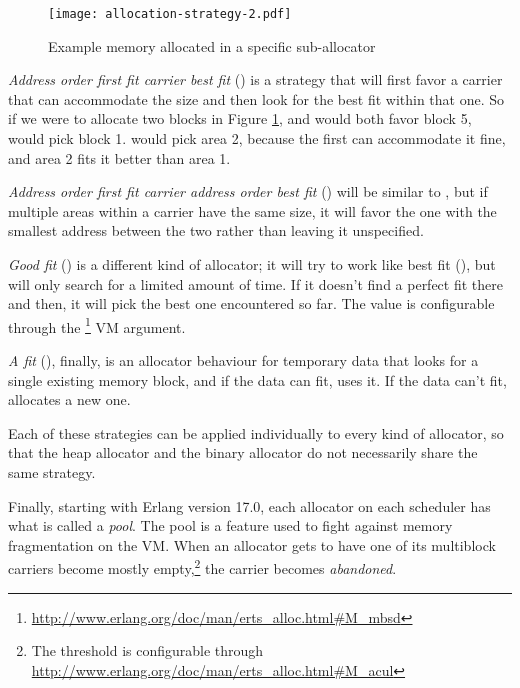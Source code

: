 \begin{figure}
  \texttt{[image: allocation-strategy-2.pdf]}%
  \centering%
  \caption{Example memory allocated in a specific sub-allocator}%
   \label{fig:allocation-strategy-2}
\end{figure}
\FloatBarrier

\emph{Address order first fit carrier best fit} () is a strategy that will first favor a carrier that can accommodate the size and then look for the best fit within that one. So if we were to allocate two blocks in Figure \ref{fig:allocation-strategy-2},  and  would both favor block 5,  would pick block 1.  would pick area 2, because the first  can accommodate it fine, and area 2 fits it better than area 1.

\emph{Address order first fit carrier address order best fit} () will be similar to , but if multiple areas within a carrier have the same size, it will favor the one with the smallest address between the two rather than leaving it unspecified.

\emph{Good fit} () is a different kind of allocator; it will try to work like best fit (), but will only search for a limited amount of time. If it doesn't find a perfect fit there and then, it will pick the best one encountered so far. The value is configurable through the \footnote{\href{http://www.erlang.org/doc/man/erts\_alloc.html\#M\_mbsd}{http://www.erlang.org/doc/man/erts\_alloc.html\#M\_mbsd}} VM argument.

\emph{A fit} (), finally, is an allocator behaviour for temporary data that looks for a single existing memory block, and if the data can fit,  uses it. If the data can't fit,  allocates a new one.

Each of these strategies can be applied individually to every kind of allocator, so that the heap allocator and the binary allocator do not necessarily share the same strategy.

Finally, starting with Erlang version 17.0, each  allocator on each scheduler has what is called a \emph{ pool}. The  pool is a feature used to fight against memory fragmentation on the VM. When an allocator gets to have one of its multiblock carriers become mostly empty,\footnote{The threshold is configurable through \href{http://www.erlang.org/doc/man/erts\_alloc.html\#M\_acul}{http://www.erlang.org/doc/man/erts\_alloc.html\#M\_acul}} the carrier becomes \emph{abandoned}.

